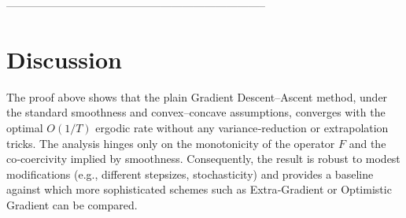 \documentclass{article}
\begin{document}
-----------------------------------------------------------------------

\section*{Discussion}
The proof above shows that the plain Gradient Descent–Ascent method,
under the standard smoothness and convex–concave assumptions,
converges with the optimal $O(1/T)$ ergodic rate without any
variance‑reduction or extrapolation tricks.  The analysis hinges only on
the monotonicity of the operator $F$ and the co‑coercivity implied by
smoothness.  Consequently, the result is robust to modest
modifications (e.g., different stepsizes, stochasticity) and provides a
baseline against which more sophisticated schemes such as Extra‑Gradient
or Optimistic Gradient can be compared.
\end{document}
